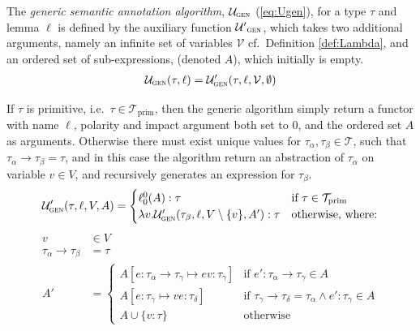 \begin{definition}
	The \emph{generic semantic annotation algorithm}, $\mathcal{U}_\textsc{gen}$ (\ref{eq:Ugen}), for a type $\tau$ and lemma $\ell$ is defined by the auxiliary function $\mathcal{U'}_\textsc{gen}$, which takes two additional arguments, namely an infinite set of variables $\mathcal{V}$ cf.\ Definition \ref{def:Lambda}, and an ordered set of sub-expressions, (denoted $A$), which initially is empty.
\begin{align}
	\mathcal{U}_\textsc{gen}(\tau, \ell) = \mathcal{U}'_\textsc{gen}(\tau, \ell, \mathcal{V}, \emptyset)
	\label{eq:Ugen}
\end{align}
\vspace{-1.5em}

If $\tau$ is primitive, i.e.\ $\tau \in \mathcal{T}_\mathrm{prim}$, then the generic algorithm simply return a functor with name $\ell$, polarity and impact argument both set to $0$, and the ordered set $A$ as arguments. Otherwise there must exist unique values for $\tau_\alpha, \tau_\beta \in \mathcal{T}$, such that $\tau_\alpha \to \tau_\beta = \tau$, and in this case the algorithm return an abstraction of $\tau_\alpha$ on variable $v \in V$, and recursively generates an expression for $\tau_\beta$.
\begin{align*}
	\mathcal{U}'_\textsc{gen}(\tau, \ell,V,A) =
	\begin{cases}
	 \ell_0^0(A) : \tau	&\text{if $\tau \in \mathcal{T}_\mathrm{prim}$} \\	
	 \lambda v . \mathcal{U}'_\textsc{gen}(\tau_\beta, \ell, V \setminus \{v \}, A') : \tau
	&\text{otherwise, where:} %
	\end{cases}
\end{align*}
\begin{align*}
	v &\in V\\
	\tau_\alpha \to \tau_\beta &= \tau\\
	A' &=
	\begin{cases}
    A [e : \tau_\alpha \to \tau_\gamma \mapsto e v : \tau_\gamma ] & \text{if $e' : \tau_\alpha \to \tau_\gamma \in A$} \\ %
    A [e : \tau_\gamma \mapsto v e : \tau_\delta ] & \text{if $\tau_\gamma \to \tau_\delta = \tau_\alpha \wedge e' : \tau_\gamma \in A$}\\
    A \cup \{v : \tau\} & \text{otherwise}
	\end{cases}

\end{align*}
\end{definition}
